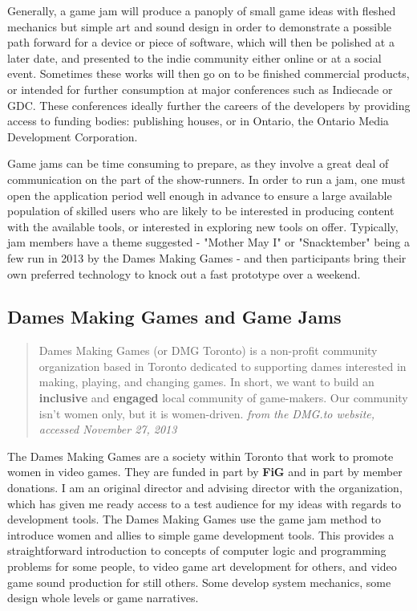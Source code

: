 Generally, a game jam will produce a panoply of small game ideas with fleshed mechanics but simple art and sound design in order to demonstrate a possible path forward for a device or piece of software, which will then be polished at a later date, and presented to the indie community either online or at a social event. Sometimes these works will then go on to be finished commercial products, or intended for further consumption at major conferences such as Indiecade or GDC. These conferences ideally further the careers of the developers by providing access to funding bodies: publishing houses, or in Ontario, the Ontario Media Development Corporation.

Game jams can be time consuming to prepare, as they involve a great deal of communication on the part of the show-runners. In order to run a jam, one must open the application period well enough in advance to ensure a large available population of skilled users who are likely to be interested in producing content with the available tools, or interested in exploring new tools on offer. Typically, jam members have a theme suggested - "Mother May I" or "Snacktember" being a few run in 2013 by the Dames Making Games - and then participants bring their own preferred technology to knock out a fast prototype over a weekend.


\subsection{Dames Making Games and Game Jams}

\begin{quote}
Dames Making Games (or DMG Toronto) is a non-profit community organization based in Toronto dedicated to supporting dames interested in making, playing, and changing games. In short, we want to build an \textbf{inclusive} and \textbf{engaged} local community of game-makers. Our community isn't women only, but it is women-driven.
\textit{from the DMG.to website, accessed November 27, 2013}
\end{quote}

The Dames Making Games are a society within Toronto that work to promote women in video games. They are funded in part by \textbf{FiG} and in part by member donations. I am an original director and advising director with the organization, which has given me ready access to a test audience for my ideas with regards to development tools. The Dames Making Games use the game jam method to introduce women and allies to simple game development tools. This provides a straightforward introduction to concepts of computer logic and programming problems for some people, to video game art development for others, and video game sound production for still others. Some develop system mechanics, some design whole levels or game narratives. 

